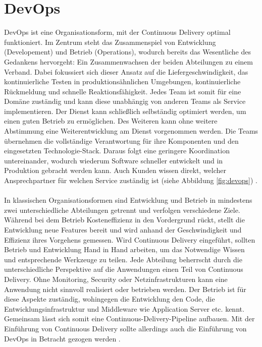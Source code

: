 \section{DevOps}
DevOps ist eine Organisationsform, mit der Continuous Delivery optimal funktioniert. Im Zentrum steht das Zusammenspiel von Entwicklung (Developement) und Betrieb (Operations), wodurch bereits das Wesentliche des Gedankens hervorgeht: Ein Zusammenwachsen der beiden Abteilungen zu einem Verband. Dabei fokussiert sich dieser Ansatz auf die Liefergeschwindigkeit, das kontinuierliche Testen in produktionsähnlichen Umgebungen, kontinuierliche Rückmeldung und schnelle Reaktionsfähigkeit. Jedes Team ist somit für eine Domäne zuständig und kann diese unabhängig von anderen Teams als Service implementieren. Der Dienst kann schließlich selbständig optimiert werden, um einen guten Betrieb zu ermöglichen. Des Weiteren kann ohne weitere Abstimmung eine Weiterentwicklung am Dienst vorgenommen werden. Die Teams übernehmen die vollständige Verantwortung für ihre Komponenten und den eingesetzten Technologie-Stack. Daraus folgt eine geringere Koordination untereinander, wodurch wiederum Software schneller entwickelt und in Produktion gebracht werden kann. Auch Kunden wissen direkt, welcher Ansprechpartner für welchen Service zuständig ist (siehe Abbildung \ref{fig:devops}) \cite{Wolff.2016}.\\ \\
In klassischen Organisationsformen sind Entwicklung und Betrieb in mindestens zwei unterschiedliche Abteilungen getrennt und verfolgen verschiedene Ziele. Während bei dem Betrieb Kosteneffizienz in den Vordergrund rückt, stellt die Entwicklung neue Features bereit und wird anhand der Geschwindigkeit und Effizienz ihres Vorgehens gemessen. Wird Continuous Delivery eingeführt, sollten Betrieb und Entwicklung Hand in Hand arbeiten, um das Notwendige Wissen und entsprechende Werkzeuge zu teilen. Jede Abteilung beherrscht durch die unterschiedliche Perspektive auf die Anwendungen einen Teil von Continuous Delivery. Ohne Monitoring, Security oder Netzinfrastrukturen kann eine Anwendung nicht sinnvoll realisiert oder betrieben werden. Der Betrieb ist für diese Aspekte zuständig, wohingegen die Entwicklung den Code, die Entwicklungsinfrastruktur und Middleware wie Application Server etc. kennt. Gemeinsam lässt sich somit eine Continuous-Delivery-Pipeline aufbauen. Mit der Einführung von Continuous Delivery sollte allerdings auch die Einführung von DevOps in Betracht gezogen werden \cite{Wolff.2016}.\\ \\
